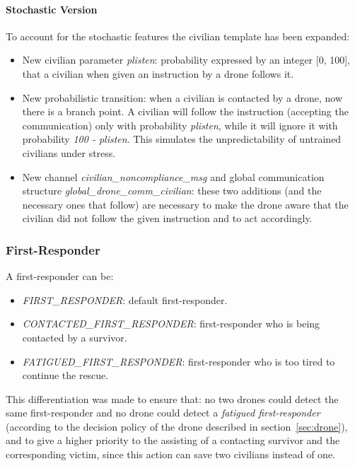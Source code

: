 \paragraph{Stochastic Version}
To account for the stochastic features the civilian template has been expanded:
\begin{itemize}
	\item New civilian parameter \textit{plisten}: probability expressed by an integer [0, 100], that a civilian when given an instruction by a drone follows it.
	\item New probabilistic transition: when a civilian is contacted by a drone, now there is a branch point. A civilian will follow the instruction (accepting the communication) only with probability \textit{plisten}, while it will ignore it with probability \textit{100 - plisten}. This simulates the unpredictability of untrained civilians under stress.
	\item New channel \textit{civilian\_noncompliance\_msg} and global communication structure \textit{global\_drone\_comm\_civilian}: these two additions (and the necessary ones that follow) are necessary to make the drone aware that the civilian did not follow the given instruction and to act accordingly.
\end{itemize}
	
\subsubsection{First-Responder}
A first-responder can be:
\begin{itemize}
	\item \textit{FIRST\_RESPONDER}: default first-responder.
	\item \textit{CONTACTED\_FIRST\_RESPONDER}: first-responder who is being contacted by a survivor.
	\item \textit{FATIGUED\_FIRST\_RESPONDER}: first-responder who is too tired to continue the rescue.
\end{itemize}

\noindent
This differentiation was made to ensure that: no two drones could detect the same first-responder and no drone could detect a \textit{fatigued first-responder} (according to the decision policy of the drone described in section~\ref{sec:drone}), and to give a higher priority to the assisting of a contacting survivor and the corresponding victim, since this action can save two civilians instead of one.\newline

